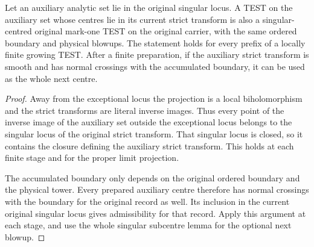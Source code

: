 \begin{theorem}
\label{hir:g8-lift-test-of-singular-stratum}
\leanok
Let an auxiliary analytic set lie in the original singular locus.
A TEST on the auxiliary set whose centres lie in its current strict
transform is also a singular-centred original mark-one TEST on the
original carrier, with the same ordered boundary and physical
blowups. The statement holds for every prefix of a locally finite
growing TEST. After a finite preparation, if the auxiliary strict
transform is smooth and has normal crossings with the accumulated
boundary, it can be used as the whole next centre.
\end{theorem}
\begin{proof}
Away from the exceptional locus the projection is a local
biholomorphism and the strict transforms are literal inverse
images. Thus every point of the inverse image of the auxiliary
set outside the exceptional locus belongs to the singular locus
of the original strict transform. That singular locus is closed,
so it contains the closure defining the auxiliary strict transform.
This holds at each finite stage and for the proper limit projection.

The accumulated boundary only depends on the original ordered
boundary and the physical tower. Every prepared auxiliary centre
therefore has normal crossings with the boundary for the
original record as well. Its inclusion in the current original
singular locus gives admissibility for that record. Apply this
argument at each stage, and use the whole singular subcentre
lemma for the optional next blowup.
\end{proof}
